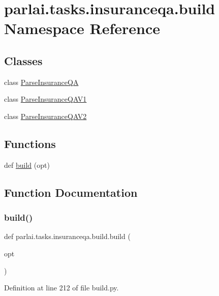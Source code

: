 \hypertarget{namespaceparlai_1_1tasks_1_1insuranceqa_1_1build}{}\section{parlai.\+tasks.\+insuranceqa.\+build Namespace Reference}
\label{namespaceparlai_1_1tasks_1_1insuranceqa_1_1build}
\subsection*{Classes}
\begin{DoxyCompactItemize}
\item 
class \hyperlink{classparlai_1_1tasks_1_1insuranceqa_1_1build_1_1ParseInsuranceQA}{Parse\+Insurance\+QA}
\item 
class \hyperlink{classparlai_1_1tasks_1_1insuranceqa_1_1build_1_1ParseInsuranceQAV1}{Parse\+Insurance\+Q\+A\+V1}
\item 
class \hyperlink{classparlai_1_1tasks_1_1insuranceqa_1_1build_1_1ParseInsuranceQAV2}{Parse\+Insurance\+Q\+A\+V2}
\end{DoxyCompactItemize}
\subsection*{Functions}
\begin{DoxyCompactItemize}
\item 
def \hyperlink{namespaceparlai_1_1tasks_1_1insuranceqa_1_1build_ae48219c5a8158e6688a2b3dba93a99a2}{build} (opt)
\end{DoxyCompactItemize}


\subsection{Function Documentation}
\mbox{\label{namespaceparlai_1_1tasks_1_1insuranceqa_1_1build_ae48219c5a8158e6688a2b3dba93a99a2}} 
\subsubsection{\texorpdfstring{build()}{build()}}
{\footnotesize\ttfamily def parlai.\+tasks.\+insuranceqa.\+build.\+build (\begin{DoxyParamCaption}\item[{}]{opt }\end{DoxyParamCaption})}



Definition at line 212 of file build.\+py.

